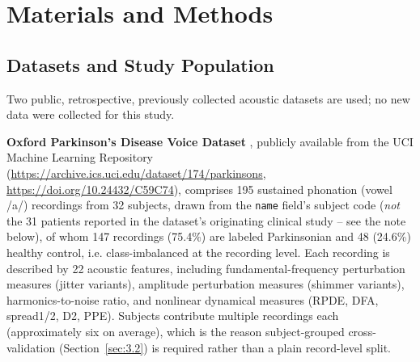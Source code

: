 %

\section{Materials and Methods}
\label{sec:3}

\subsection{Datasets and Study Population}
\label{sec:3.1}

Two public, retrospective, previously collected acoustic datasets are
used; no new data were collected for this study.

\textbf{Oxford Parkinson's Disease Voice Dataset} \cite{Little:2008},
publicly available from the UCI Machine Learning Repository
(\url{https://archive.ics.uci.edu/dataset/174/parkinsons},
\url{https://doi.org/10.24432/C59C74}), comprises 195 sustained phonation
(vowel /a/) recordings from 32 subjects, drawn from the \texttt{name}
field's subject code (\emph{not} the 31 patients reported in the
dataset's originating clinical study -- see the note below), of whom 147
recordings (75.4\%) are labeled
Parkinsonian and 48 (24.6\%) healthy control, i.e. class-imbalanced at the
recording level. Each recording is described by 22 acoustic features,
including fundamental-frequency perturbation measures (jitter variants),
amplitude perturbation measures (shimmer variants), harmonics-to-noise
ratio, and nonlinear dynamical measures (RPDE, DFA, spread1/2, D2, PPE).
Subjects contribute multiple recordings each (approximately six on
average), which is the reason subject-grouped cross-validation
(Section~\ref{sec:3.2}) is required rather than a plain
record-level split.

